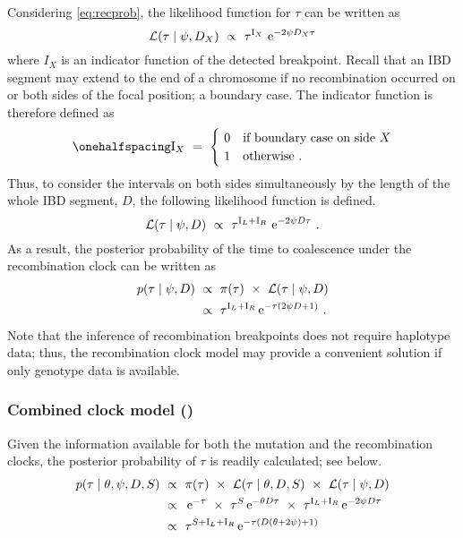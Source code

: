 Considering \cref{eq:recprob}, the likelihood function for $\tau$ can be written as
\begin{equation}\label{eq:reclike_x}
	\mathcal{L}(\tau \mid \psi, D_X)
	~\propto~ \tau^{\mathrm{I}_X} \, \,\mathrm{e}^{-2 \psi D_X \tau}
\end{equation}
where $I_X$ is an indicator function of the detected breakpoint.
Recall that an IBD segment may extend to the end of a chromosome if no recombination occurred on  or both sides of the focal position; \ie a boundary case.
The indicator function is therefore defined as
\begin{equation*}\onehalfspacing
	\mathrm{I}_X ~=~
	\begin{cases}
    ~ 0 & \text{if boundary case on side}~X \\
    ~ 1 & \text{otherwise}\ .
  \end{cases}
\end{equation*}
Thus, to consider the intervals on both sides simultaneously by the length of the whole IBD segment, $D$, the following likelihood function is defined.
\begin{equation}\label{eq:reclike}
	\mathcal{L}(\tau \mid \psi, D)
	~\propto~ \tau^{\mathrm{I}_L + \mathrm{I}_R} \, \,\mathrm{e}^{-2 \psi D \tau}\ .
\end{equation}
As a result, the posterior probability of the time to coalescence under the recombination clock can be written as
\begin{equation}
\begin{split}
	p(\tau \mid \psi, D)
	&~\propto~
	\pi(\tau) ~\times~ \mathcal{L}(\tau \mid \psi, D) \\
	&~\propto~
	\tau^{\mathrm{I}_L + \mathrm{I}_R} \,\mathrm{e}^{- \tau (2 \psi D + 1)}\ .
\end{split}
\end{equation}
Note that the inference of recombination breakpoints does not require haplotype data; thus, the recombination clock model may provide a convenient solution if only genotype data is available.


%
\subsubsection{Combined clock model (\ClockC)}
%

Given the information available for both the mutation and the recombination clocks, the posterior probability of $\tau$ is readily calculated; see below.
\begin{equation}\label{eq:comlike}
\begin{split}
	p(\tau \mid \theta,\psi,D,S)
	& ~\propto~
	\pi(\tau) ~\times~
	\mathcal{L}(\tau \mid \theta, D, S) ~\times~
	\mathcal{L}(\tau \mid \psi, D) \\
	& ~\propto~
	\,\mathrm{e}^{-\tau} ~\times~
	\tau^S \,\mathrm{e}^{-\theta D \tau} ~\times~
	\tau^{\mathrm{I}_L + \mathrm{I}_R} \,\mathrm{e}^{-2 \psi D \tau} \\
	& ~\propto~
	\tau^{S + \mathrm{I}_L + \mathrm{I}_R} \,\mathrm{e}^{-\tau (D(\theta + 2 \psi) + 1)}
\end{split}
\end{equation}

